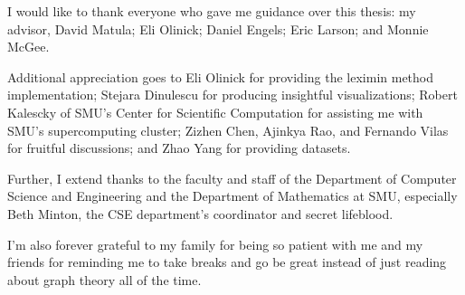 I would like to thank everyone who gave me guidance over this thesis: my advisor, David Matula; Eli Olinick; Daniel Engels; Eric Larson; and Monnie McGee.

Additional appreciation goes to Eli Olinick for providing the leximin method implementation; Stejara Dinulescu for producing insightful visualizations; Robert Kalescky of SMU's Center for Scientific Computation for assisting me with SMU's  supercomputing cluster; Zizhen Chen, Ajinkya Rao, and Fernando Vilas for fruitful discussions; and Zhao Yang for providing datasets.

Further, I extend thanks to the faculty and staff of the Department of Computer Science and Engineering and the Department of Mathematics at SMU, especially Beth Minton, the CSE department's coordinator and secret lifeblood.

I'm also forever grateful to my family for being so patient with me and my friends for reminding me to take breaks and go be great instead of just reading about graph theory all of the time. 
